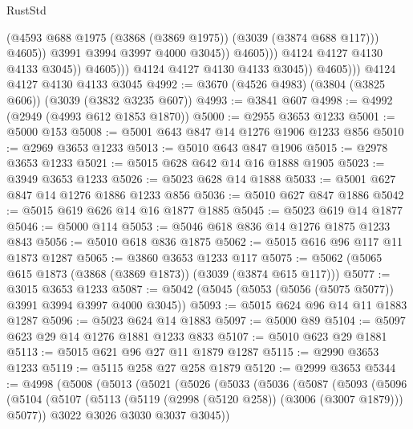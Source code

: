 \begin{lexlean}{RustStd}
\begin{coremodule}
                                      (@4593
                                        @688
                                        @1975
                                        (@3868 (@3869 @1975))
                                        (@3039 (@3874 @688 @117)))
                                      @4605))
                                  @3991
                                  @3994
                                  @3997
                                  @4000
                                  @3045))
                              @4605)))
                        @4124
                        @4127
                        @4130
                        @4133
                        @3045))
                    @4605)))
              @4124
              @4127
              @4130
              @4133
              @3045))
          @4605)))
    @4124
    @4127
    @4130
    @4133
    @3045
@4992 := @3670 (@4526 @4983) (@3804 (@3825 @606)) (@3039 (@3832 @3235 @607))
@4993 := @3841 @607
@4998 := @4992 (@2949 (@4993 @612 @1853 @1870))
@5000 := @2955 @3653 @1233
@5001 := @5000 @153
@5008 := @5001 @643 @847 @14 @1276 @1906 @1233 @856
@5010 := @2969 @3653 @1233
@5013 := @5010 @643 @847 @1906
@5015 := @2978 @3653 @1233
@5021 := @5015 @628 @642 @14 @16 @1888 @1905
@5023 := @3949 @3653 @1233
@5026 := @5023 @628 @14 @1888
@5033 := @5001 @627 @847 @14 @1276 @1886 @1233 @856
@5036 := @5010 @627 @847 @1886
@5042 := @5015 @619 @626 @14 @16 @1877 @1885
@5045 := @5023 @619 @14 @1877
@5046 := @5000 @114
@5053 := @5046 @618 @836 @14 @1276 @1875 @1233 @843
@5056 := @5010 @618 @836 @1875
@5062 := @5015 @616 @96 @117 @11 @1873 @1287
@5065 := @3860 @3653 @1233 @117
@5075 := @5062 (@5065 @615 @1873 (@3868 (@3869 @1873)) (@3039 (@3874 @615 @117)))
@5077 := @3015 @3653 @1233
@5087 := @5042 (@5045 (@5053 (@5056 (@5075 @5077)) @3991 @3994 @3997 @4000 @3045))
@5093 := @5015 @624 @96 @14 @11 @1883 @1287
@5096 := @5023 @624 @14 @1883
@5097 := @5000 @89
@5104 := @5097 @623 @29 @14 @1276 @1881 @1233 @833
@5107 := @5010 @623 @29 @1881
@5113 := @5015 @621 @96 @27 @11 @1879 @1287
@5115 := @2990 @3653 @1233
@5119 := @5115 @258 @27 @258 @1879
@5120 := @2999 @3653
@5344 := @4998
    (@5008
      (@5013
        (@5021
          (@5026
            (@5033
              (@5036
                (@5087
                  (@5093
                    (@5096
                      (@5104
                        (@5107 (@5113 (@5119 (@2998 (@5120 @258)) (@3006 (@3007 @1879))) @5077))
                        @3022
                        @3026
                        @3030
                        @3037
                        @3045))

\end{coremodule}
\end{lexlean}
